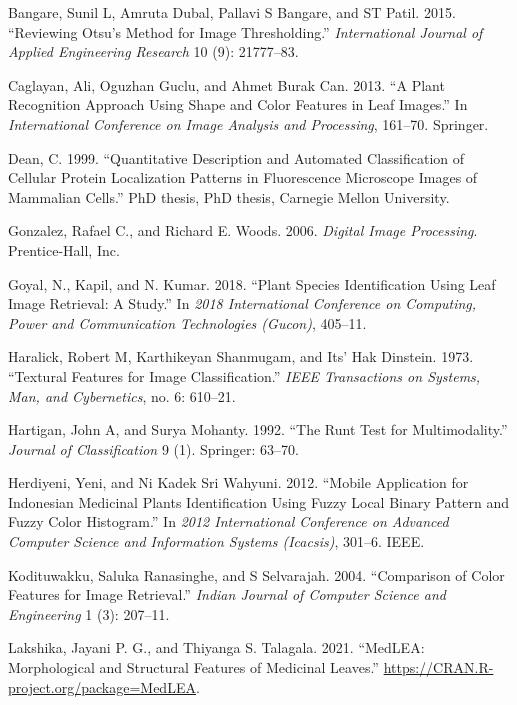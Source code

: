 \documentclass{article}
\begin{document}
\leavevmode\hypertarget{ref-bangare2015reviewing}{}%
Bangare, Sunil L, Amruta Dubal, Pallavi S Bangare, and ST Patil. 2015.
``Reviewing Otsu's Method for Image Thresholding.'' \emph{International
Journal of Applied Engineering Research} 10 (9): 21777--83.

\leavevmode\hypertarget{ref-inproceedings1}{}%
Caglayan, Ali, Oguzhan Guclu, and Ahmet Burak Can. 2013. ``A Plant
Recognition Approach Using Shape and Color Features in Leaf Images.'' In
\emph{International Conference on Image Analysis and Processing},
161--70. Springer.

\leavevmode\hypertarget{ref-article31}{}%
Dean, C. 1999. ``Quantitative Description and Automated Classification
of Cellular Protein Localization Patterns in Fluorescence Microscope
Images of Mammalian Cells.'' PhD thesis, PhD thesis, Carnegie Mellon
University.

\leavevmode\hypertarget{ref-book1}{}%
Gonzalez, Rafael C., and Richard E. Woods. 2006. \emph{Digital Image
Processing}. Prentice-Hall, Inc.

\leavevmode\hypertarget{ref-8675114}{}%
Goyal, N., Kapil, and N. Kumar. 2018. ``Plant Species Identification
Using Leaf Image Retrieval: A Study.'' In \emph{2018 International
Conference on Computing, Power and Communication Technologies (Gucon)},
405--11.

\leavevmode\hypertarget{ref-articletx}{}%
Haralick, Robert M, Karthikeyan Shanmugam, and Its' Hak Dinstein. 1973.
``Textural Features for Image Classification.'' \emph{IEEE Transactions
on Systems, Man, and Cybernetics}, no. 6: 610--21.

\leavevmode\hypertarget{ref-hartigan1992runt}{}%
Hartigan, John A, and Surya Mohanty. 1992. ``The Runt Test for
Multimodality.'' \emph{Journal of Classification} 9 (1). Springer:
63--70.

\leavevmode\hypertarget{ref-inproceedings}{}%
Herdiyeni, Yeni, and Ni Kadek Sri Wahyuni. 2012. ``Mobile Application
for Indonesian Medicinal Plants Identification Using Fuzzy Local Binary
Pattern and Fuzzy Color Histogram.'' In \emph{2012 International
Conference on Advanced Computer Science and Information Systems
(Icacsis)}, 301--6. IEEE.

\leavevmode\hypertarget{ref-colarticle1}{}%
Kodituwakku, Saluka Ranasinghe, and S Selvarajah. 2004. ``Comparison of
Color Features for Image Retrieval.'' \emph{Indian Journal of Computer
Science and Engineering} 1 (3): 207--11.

\leavevmode\hypertarget{ref-medlea}{}%
Lakshika, Jayani P. G., and Thiyanga S. Talagala. 2021. ``MedLEA:
Morphological and Structural Features of Medicinal Leaves.''
\url{https://CRAN.R-project.org/package=MedLEA}.
\end{document}
